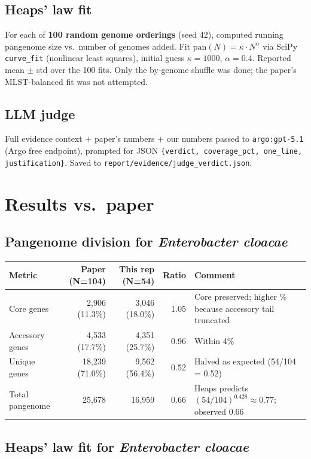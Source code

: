 \documentclass[11pt,a4paper]{article}
\begin{document}
\subsection{Heaps' law fit}
For each of \textbf{100 random genome orderings} (seed 42), computed running pangenome size vs.\ number of genomes added. Fit $\mathrm{pan}(N) = \kappa \cdot N^\alpha$ via SciPy \texttt{curve\_fit} (nonlinear least squares), initial guess $\kappa=1000$, $\alpha=0.4$. Reported mean $\pm$ std over the 100 fits. Only the by-genome shuffle was done; the paper's MLST-balanced fit was not attempted.

\subsection{LLM judge}
Full evidence context $+$ paper's numbers $+$ our numbers passed to \texttt{argo:gpt-5.1} (Argo free endpoint), prompted for JSON \texttt{\{verdict, coverage\_pct, one\_line, justification\}}. Saved to \texttt{report/evidence/judge\_verdict.json}.

\section{Results vs.\ paper}

\subsection{Pangenome division for \textit{Enterobacter cloacae}}

\begin{center}
\begin{tabular}{lrrrl}
\toprule
Metric & Paper (N=104) & This rep (N=54) & Ratio & Comment \\
\midrule
Core genes       & 2{,}906 (11.3\%) & 3{,}046 (18.0\%) & 1.05 & Core preserved; higher \% because accessory tail truncated \\
Accessory genes  & 4{,}533 (17.7\%) & 4{,}351 (25.7\%) & 0.96 & Within 4\% \\
Unique genes     & 18{,}239 (71.0\%) & 9{,}562 (56.4\%) & 0.52 & Halved as expected (54/104 = 0.52) \\
Total pangenome  & 25{,}678         & 16{,}959         & 0.66 & Heaps predicts $(54/104)^{0.428}\approx 0.77$; observed 0.66 \\
\bottomrule
\end{tabular}
\end{center}

\subsection{Heaps' law fit for \textit{Enterobacter cloacae}}
\end{document}
